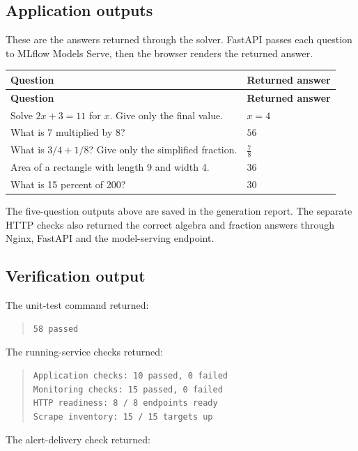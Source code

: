 \documentclass[11pt,a4paper]{article}
\begin{document}
\subsection*{Application outputs}
These are the answers returned through the solver. FastAPI passes each question to MLflow Models Serve, then the browser renders the returned answer.

\begingroup\small
\begin{longtable}{@{}>{\raggedright\arraybackslash}p{0.5000\dimexpr\textwidth-12pt\relax}>{\raggedright\arraybackslash}p{0.5000\dimexpr\textwidth-12pt\relax}@{}}
\toprule
\textbf{Question} & \textbf{Returned answer} \\
\midrule
\endfirsthead
\textbf{Question} & \textbf{Returned answer} \\
\midrule
\endhead
Solve $2x+3=11$ for $x$. Give only the final value. & $x=4$ \\
What is 7 multiplied by 8? & $56$ \\
What is $3/4+1/8$? Give only the simplified fraction. & $\frac{7}{8}$ \\
Area of a rectangle with length 9 and width 4. & $36$ \\
What is 15 percent of 200? & $30$ \\
\bottomrule
\end{longtable}
\endgroup
The five-question outputs above are saved in the generation report. The separate HTTP checks also returned the correct algebra and fraction answers through Nginx, FastAPI and the model-serving endpoint.

\subsection*{Verification output}
The unit-test command returned:

\begin{quote}\small
\begin{verbatim}
58 passed
\end{verbatim}
\end{quote}
The running-service checks returned:

\begin{quote}\small
\begin{verbatim}
Application checks: 10 passed, 0 failed
Monitoring checks: 15 passed, 0 failed
HTTP readiness: 8 / 8 endpoints ready
Scrape inventory: 15 / 15 targets up
\end{verbatim}
\end{quote}
The alert-delivery check returned:
\end{document}
